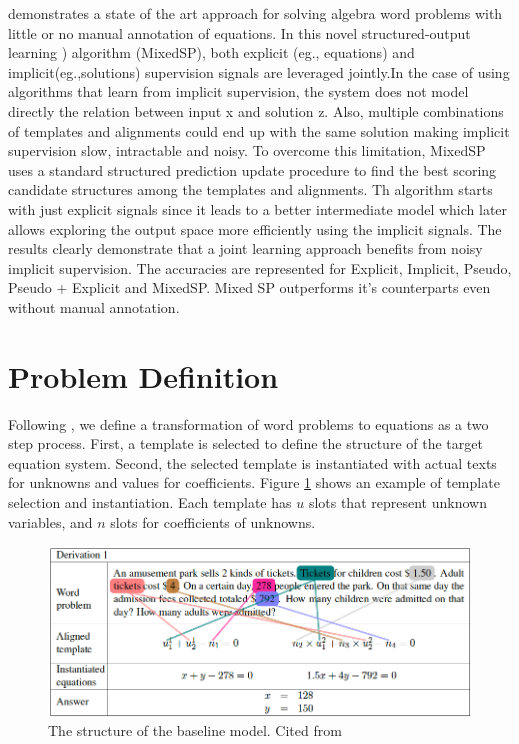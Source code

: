 \documentclass[11pt,letterpaper]{article}
\begin{document}
\cite{UpChChYi16} demonstrates a state of the art approach for solving algebra word problems with little or no manual annotation of equations. In this novel structured-output learning ) algorithm (MixedSP), both explicit (eg., equations) and implicit(eg.,solutions) supervision signals are leveraged jointly.In the case of using algorithms that learn from implicit supervision, the system does not model directly the relation between input x and solution z. Also, multiple combinations of templates and alignments could end up with the same solution making implicit supervision slow, intractable and noisy. To overcome this limitation, MixedSP uses a standard structured prediction update procedure to find the best scoring candidate structures among the templates and alignments. Th algorithm starts with just explicit signals since it leads to a better intermediate model which later allows exploring the output space more efficiently using the implicit signals. The results clearly demonstrate that a joint learning approach benefits from noisy implicit supervision. The accuracies are represented for Explicit, Implicit, Pseudo, Pseudo + Explicit and MixedSP. Mixed SP outperforms it's counterparts even without manual annotation.



\section{Problem Definition}
Following \cite{Kushman2014LearningTA}, we define a transformation of word problems to equations as a two step process. First, a template is selected to define the structure of the target equation system. Second, the selected template is instantiated with actual texts for unknowns and values for coefficients. Figure \ref{template} shows an example of template selection and instantiation. Each template has $u$ slots that represent unknown variables, and $n$ slots for coefficients of unknowns.
\begin{figure}[ht]
	\centering
	\includegraphics[bb=0 0 877 353, scale=0.5]{template.png}%
    \caption{The structure of the baseline model. Cited from \cite{Kushman2014LearningTA}}
    \label{template}
\end{figure}
\end{document}
